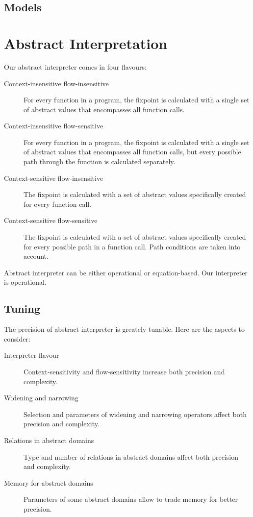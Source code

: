 \documentclass{article}
\begin{document}
\subsection{Models}

\section{Abstract Interpretation}
Our abstract interpreter comes in four flavours:
\begin{description}
\item[Context-insensitive flow-insensitive] For every function in a
  program, the fixpoint is calculated with a single set of abstract
  values that encompasses all function calls.
\item[Context-insensitive flow-sensitive] For every function in a
  program, the fixpoint is calculated with a single set of abstract
  values that encompasses all function calls, but every possible path
  through the function is calculated separately.
\item[Context-sensitive flow-insensitive] The fixpoint is calculated
  with a set of abstract values specifically created for every
  function call.
\item[Context-sensitive flow-sensitive] The fixpoint is calculated
  with a set of abstract values specifically created for every
  possible path in a function call.  Path conditions are taken into
  account.
\end{description}

Abstract interpreter can be either operational or equation-based.  Our
interpreter is operational.

\subsection{Tuning}
The precision of abstract interpreter is greately tunable. Here are
the aspects to consider:
\begin{description}
\item[Interpreter flavour] Context-sensitivity and flow-sensitivity
  increase both precision and complexity.
\item[Widening and narrowing] Selection and parameters of widening and
  narrowing operators affect both precision and complexity.
\item[Relations in abstract domains] Type and number of relations in
  abstract domains affect both precision and complexity.
\item[Memory for abstract domains] Parameters of some abstract domains
  allow to trade memory for better precision.
\end{description}
\end{document}
